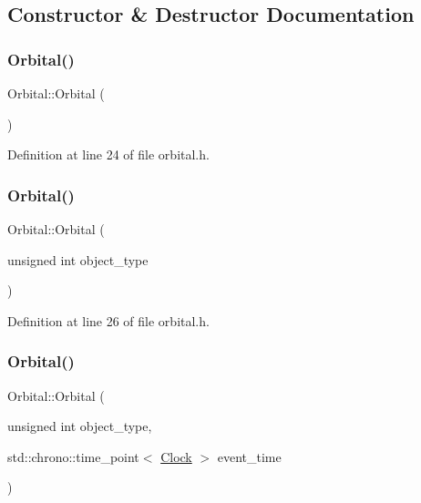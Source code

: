 \subsection{Constructor \& Destructor Documentation}
\mbox{\label{class_orbital_ac6f5367141eaa6fb4fa825262da4593a}} 
\subsubsection{\texorpdfstring{Orbital()}{Orbital()}\hspace{0.1cm}{\footnotesize\ttfamily [1/4]}}
{\footnotesize\ttfamily Orbital\+::\+Orbital (\begin{DoxyParamCaption}{ }\end{DoxyParamCaption})\hspace{0.3cm}{\ttfamily [inline]}}



Definition at line 24 of file orbital.\+h.

\mbox{\label{class_orbital_a1c7dd9f58b740ce5058ce04aab54292c}} 
\subsubsection{\texorpdfstring{Orbital()}{Orbital()}\hspace{0.1cm}{\footnotesize\ttfamily [2/4]}}
{\footnotesize\ttfamily Orbital\+::\+Orbital (\begin{DoxyParamCaption}\item[{unsigned int}]{object\+\_\+type }\end{DoxyParamCaption})\hspace{0.3cm}{\ttfamily [inline]}}



Definition at line 26 of file orbital.\+h.

\mbox{\label{class_orbital_a099b2f1d77a36181fdf1820a6089a05b}} 
\subsubsection{\texorpdfstring{Orbital()}{Orbital()}\hspace{0.1cm}{\footnotesize\ttfamily [3/4]}}
{\footnotesize\ttfamily Orbital\+::\+Orbital (\begin{DoxyParamCaption}\item[{unsigned int}]{object\+\_\+type,  }\item[{std\+::chrono\+::time\+\_\+point$<$ \hyperlink{universe_8h_a0ef8d951d1ca5ab3cfaf7ab4c7a6fd80}{Clock} $>$}]{event\+\_\+time }\end{DoxyParamCaption})\hspace{0.3cm}{\ttfamily [inline]}}



